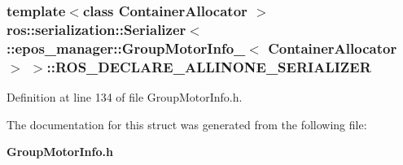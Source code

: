 \subsubsection[{\-R\-O\-S\-\_\-\-D\-E\-C\-L\-A\-R\-E\-\_\-\-A\-L\-L\-I\-N\-O\-N\-E\-\_\-\-S\-E\-R\-I\-A\-L\-I\-Z\-E\-R}]{\setlength{\rightskip}{0pt plus 5cm}template$<$class Container\-Allocator $>$ ros\-::serialization\-::\-Serializer$<$ \-::{\bf epos\-\_\-manager\-::\-Group\-Motor\-Info\-\_\-}$<$ \-Container\-Allocator $>$ $>$\-::{\bf \-R\-O\-S\-\_\-\-D\-E\-C\-L\-A\-R\-E\-\_\-\-A\-L\-L\-I\-N\-O\-N\-E\-\_\-\-S\-E\-R\-I\-A\-L\-I\-Z\-E\-R}}\label{structros_1_1serialization_1_1Serializer_3_01_1_1epos__manager_1_1GroupMotorInfo___3_01ContainerAllocator_01_4_01_4_a51055e3c1fe089078adc29006a9e1752}


\-Definition at line 134 of file \-Group\-Motor\-Info.\-h.



\-The documentation for this struct was generated from the following file\-:\begin{DoxyCompactItemize}
\item 
{\bf \-Group\-Motor\-Info.\-h}\end{DoxyCompactItemize}
